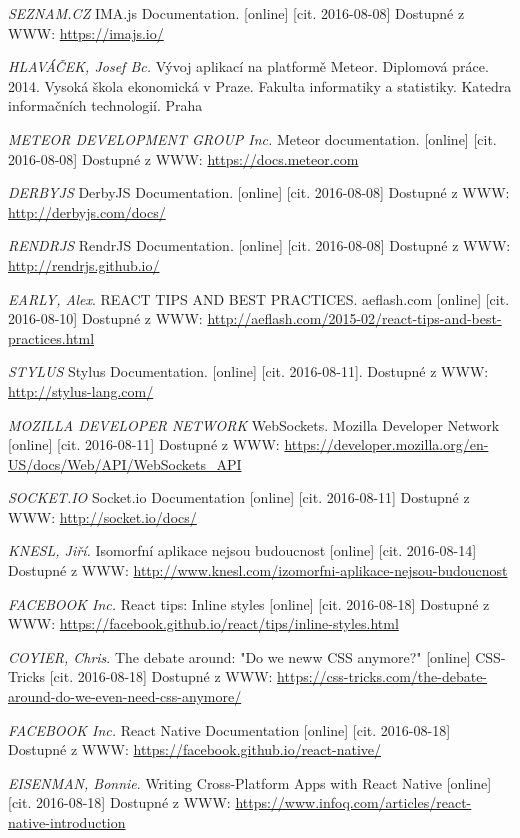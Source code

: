 \begin{thebibliography}{10}
\textit{SEZNAM.CZ} IMA.js Documentation. [online] [cit. 2016-08-08] Dostupné z WWW: \url{https://imajs.io/}

 \textit{HLAVÁČEK, Josef Bc.} Vývoj aplikací na platformě Meteor. Diplomová práce. 2014. Vysoká škola ekonomická v Praze. Fakulta	informatiky a statistiky. Katedra informačních	technologií. Praha

 \textit{METEOR DEVELOPMENT GROUP Inc.} Meteor documentation. [online] [cit. 2016-08-08] Dostupné z WWW: \url{https://docs.meteor.com}

 \textit{DERBYJS} DerbyJS Documentation. [online] [cit. 2016-08-08] Dostupné z WWW: \url{http://derbyjs.com/docs/}

 \textit{RENDRJS} RendrJS Documentation. [online] [cit. 2016-08-08] Dostupné z WWW: \url{http://rendrjs.github.io/}

\textit{EARLY, Alex}. REACT TIPS AND BEST PRACTICES. aeflash.com [online] [cit. 2016-08-10] Dostupné z WWW: \url{http://aeflash.com/2015-02/react-tips-and-best-practices.html}

 \textit{STYLUS} Stylus Documentation. [online] [cit. 2016-08-11]. Dostupné z WWW: \url{http://stylus-lang.com/}

 \textit{MOZILLA DEVELOPER NETWORK} WebSockets. Mozilla Developer Network [online] [cit. 2016-08-11] Dostupné z WWW: \url{https://developer.mozilla.org/en-US/docs/Web/API/WebSockets_API}

 \textit{SOCKET.IO} Socket.io Documentation [online] [cit. 2016-08-11] Dostupné z WWW: \url{http://socket.io/docs/}

 \textit{KNESL, Jiří.} Isomorfní aplikace nejsou budoucnost [online] [cit. 2016-08-14] Dostupné z WWW: \url{http://www.knesl.com/izomorfni-aplikace-nejsou-budoucnost}

\textit{FACEBOOK Inc.} React tips: Inline styles [online] [cit. 2016-08-18]  Dostupné z WWW: \url{https://facebook.github.io/react/tips/inline-styles.html}

 \textit{COYIER, Chris}. The debate around: "Do we neww CSS anymore?" [online] CSS-Tricks [cit. 2016-08-18] Dostupné z WWW: \url{https://css-tricks.com/the-debate-around-do-we-even-need-css-anymore/}

 \textit{FACEBOOK Inc.} React Native Documentation [online] [cit. 2016-08-18] Dostupné z WWW: \url{https://facebook.github.io/react-native/}

 \textit{EISENMAN, Bonnie}. Writing Cross-Platform Apps with React Native [online] [cit. 2016-08-18] Dostupné z WWW: \url{https://www.infoq.com/articles/react-native-introduction}

\end{thebibliography}